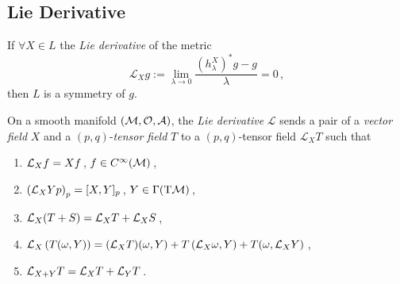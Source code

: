 \documentclass[11pt, a4paper, twocolumn]{article} %
\begin{document}
    \subsection{Lie Derivative}
    If $\forall X \in L$ the \textit{Lie derivative} of the metric
    \begin{equation}
        \mathcal{L}_X g:= \lim_{\lambda \to 0}
        \frac{(h^X_\lambda)^* g - g}{\lambda} =0\,,
    \end{equation}
    then $L$ is a symmetry of $g$.

    \begin{defn}
        On a smooth manifold $(\mathcal{M}, \mathcal{O},\mathcal{A})$, the \textit{Lie derivative}
        $\mathcal{L}$ sends a pair of a \textit{vector field} $X$ and a
        $(p,q)$-\textit{tensor field} $T$ to a $(p,q)$-tensor field 
        $\mathcal{L}_X T$ such that
        \begin{enumerate}
            \item $\mathcal{L}_X f = X f$\,, $f\in C^\infty(\mathcal{M})$\,,
            \item $\left(\mathcal{L}_X Yp\right)_p = [X,Y]_p$\,, $Y\in \Gamma(\T\M)$\,,
            \item $\mathcal{L}_X(T+S) = \mathcal{L}_X T + \mathcal{L}_X S$\,,
            \item $\mathcal{L}_X\left(T(\omega, Y)\right) = (\mathcal{L}_X T) (\omega, Y) +
                T\left( \mathcal{L}_X \omega, Y \right) + T(\omega, \mathcal{L}_X Y)$\,,
            \item $\mathcal{L}_{X+Y}T = \mathcal{L}_X T + \mathcal{L}_Y T$\,.
        \end{enumerate}
    \end{defn}
\end{document}
